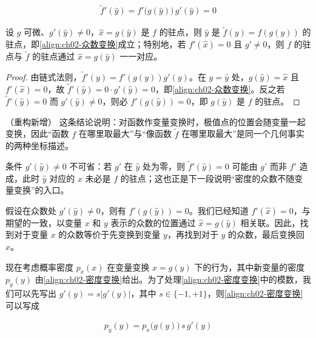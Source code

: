 \documentclass[../../main.tex]{subfiles}
\begin{document}
\begin{align}
  \tilde{f}'(\hat{y}) = f'\big(g(\hat{y})\big)\,g'(\hat{y}) = 0
  \label{align:ch02-众数变换}
\end{align}

\begin{proposition}[像函数的众数]\label{proposition:ch02-众数变换}
设 $g$ 可微、$g'(\hat{y})\neq0$，$\hat{x}=g(\hat{y})$ 是 $f$ 的驻点，则 $\hat{y}$ 是 $\tilde{f}(y)=f(g(y))$ 的驻点，即\eqref{align:ch02-众数变换}成立；特别地，若 $f'(\hat{x})=0$ 且 $g'\neq0$，则 $f$ 的驻点与 $\tilde{f}$ 的驻点通过 $\hat{x}=g(\hat{y})$ 一一对应。
\end{proposition}

\begin{proof}
由链式法则，$\tilde{f}'(y)=f'(g(y))g'(y)$。在 $y=\hat{y}$ 处，$g(\hat{y})=\hat{x}$ 且 $f'(\hat{x})=0$，故 $\tilde{f}'(\hat{y})=0\cdot g'(\hat{y})=0$，即\eqref{align:ch02-众数变换}。反之若 $\tilde{f}'(\hat{y})=0$ 而 $g'(\hat{y})\neq0$，则必 $f'(g(\hat{y}))=0$，即 $g(\hat{y})$ 是 $f$ 的驻点。
\end{proof}

\begin{remark}（重构新增）
这条结论说明：对函数作变量变换时，极值点的位置会随变量一起变换，因此“函数 $f$ 在哪里取最大”与“像函数 $\tilde f$ 在哪里取最大”是同一个几何事实的两种坐标描述。

条件 $g'(\hat{y})\neq0$ 不可省：若 $g'$ 在 $\hat y$ 处为零，则 $\tilde f'(\hat y)=0$ 可能由 $g'$ 而非 $f'$ 造成，此时 $\hat y$ 对应的 $x$ 未必是 $f$ 的驻点；这也正是下一段说明“密度的众数不随变量变换”的入口。
\end{remark}

假设在众数处 $g'(\hat{y})\neq0$，则有 $f'(g(\hat{y}))=0$。我们已经知道 $f'(\hat{x})=0$，与期望的一致，以变量 $x$ 和 $y$ 表示的众数的位置通过 $\hat{x}=g(\hat{y})$ 相关联。因此，找到对于变量 $x$ 的众数等价于先变换到变量 $y$，再找到对于 $y$ 的众数，最后变换回 $x$。

现在考虑概率密度 $p_x(x)$ 在变量变换 $x=g(y)$ 下的行为，其中新变量的密度 $p_y(y)$ 由\eqref{align:ch02-密度变换}给出。为了处理\eqref{align:ch02-密度变换}中的模数，我们可以先写出 $g'(y)=s|g'(y)|$，其中 $s\in\{-1,+1\}$，则\eqref{align:ch02-密度变换}可以写成

\begin{align}
  p_y(y) = p_x\big(g(y)\big)\,s\,g'(y)
  \label{align:ch02-密度变换带符号}
\end{align}
\end{document}
